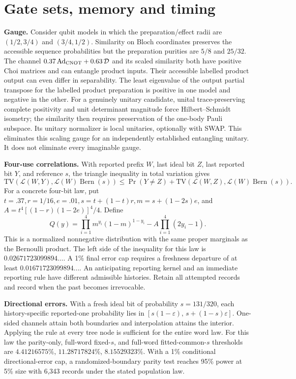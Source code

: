 \documentclass[
  10pt,
  a4paper,
]{article}
\begin{document}
\newpage

\section{Gate sets, memory and timing}\label{gate-sets-memory-and-timing}

\textbf{Gauge.} Consider qubit models in which the preparation/effect radii are \((1/2,3/4)\) and \((3/4,1/2)\). Similarity on Bloch coordinates preserves the accessible sequence probabilities but the preparation purities are \(5/8\) and \(25/32\). The channel \(0.37\,\mathrm{Ad}_{\rm CNOT}+0.63\,\mathcal D\) and its scaled similarity both have positive Choi matrices and can entangle product inputs. Their accessible labelled product output can even differ in separability. The least eigenvalue of the output partial transpose for the labelled product preparation is positive in one model and negative in the other. For a genuinely unitary candidate, unital trace-preserving complete positivity and unit determinant magnitude force Hilbert--Schmidt isometry; the similarity then requires preservation of the one-body Pauli subspace. Its unitary normalizer is local unitaries, optionally with SWAP. This eliminates this scaling gauge for an independently established entangling unitary. It does not eliminate every imaginable gauge.

\textbf{Four-use correlations.} With reported prefix \(W\), last ideal bit \(Z\), last reported bit \(Y\), and reference \(s\), the triangle inequality in total variation gives \[
 \mathrm{TV}(\mathcal L(W,Y),\mathcal L(W)\operatorname{Bern}(s))
 \le \Pr(Y\ne Z)+\mathrm{TV}(\mathcal L(W,Z),\mathcal L(W)\operatorname{Bern}(s)).
\] For a concrete four-bit law, put \(t=.37, r=1/16, e=.01, s=t+(1-t)r, m=s+(1-2s)e\), and \(A=t^4[(1-r)(1-2e)]^4/4\). Define \[
 Q(y)=\prod_{i=1}^4m^{y_i}(1-m)^{1-y_i}-A\prod_{i=1}^4(2y_i-1).
\] This is a normalized nonnegative distribution with the same proper marginals as the Bernoulli product. The left side of the inequality for this law is \(0.02671723099894\ldots\). A 1\% final error cap requires a freshness departure of at least \(0.01671723099894\ldots\). An anticipating reporting kernel and an immediate reporting rule have different admissible histories. Retain all attempted records and record when the past becomes irrevocable.

\textbf{Directional errors.} With a fresh ideal bit of probability \(s=131/320\), each history-specific reported-one probability lies in \([s(1-\varepsilon),\,s+(1-s)\varepsilon]\). One-sided channels attain both boundaries and interpolation attains the interior. Applying the rule at every tree node is sufficient for the entire word law. For this law the parity-only, full-word fixed-\(s\), and full-word fitted-common-\(s\) thresholds are \(4.41216575\%\), \(11.28717824\%\), \(8.15529323\%\). With a 1\% conditional directional-error cap, a randomized-boundary parity test reaches 95\% power at 5\% size with 6,343 records under the stated population law.
\end{document}
